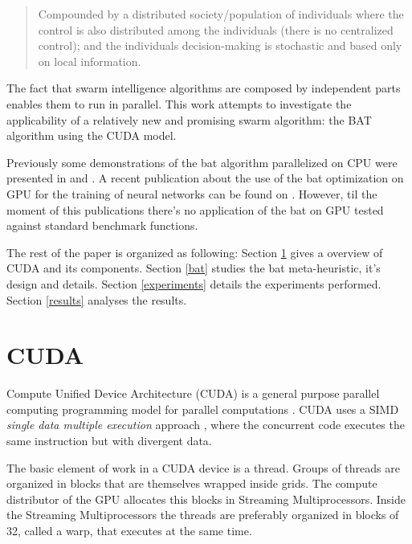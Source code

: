 \documentclass[conference]{IEEEtran}
\begin{document}
\begin{quote} Compounded by a distributed society/population of
individuals where the control is also distributed among the individuals
(there is no centralized control); and the individuals decision-making
is stochastic and based only on local information.\end{quote}

The fact that swarm intelligence algorithms are composed by
independent parts enables them to run in parallel. This work attempts
to investigate the applicability of a relatively new and promising
swarm algorithm: the BAT algorithm using the CUDA model. 

Previously some demonstrations of the bat algorithm parallelized on CPU
were presented in \cite{paralellCPUFirst} and \cite{paralellCPU}. A
recent publication about the use of the bat optimization on GPU for the training of neural networks can be found on
\cite{firstBatGPU}. However, til the moment of this publications
there's no application of the bat on GPU tested against standard
benchmark functions.

The rest of the paper is organized as following: Section \ref{cuda}
gives a overview of CUDA and its components. Section \ref{bat}
studies the bat meta-heuristic, it's design and details. Section
\ref{experiments} details the experiments performed. Section
\ref{results} analyses the results.


\section{CUDA} \label{cuda}%

Compute Unified Device Architecture (CUDA) is a general purpose
parallel computing programming model for parallel computations
\cite{cudaDefinition}. CUDA uses a SIMD \textit{single data multiple
execution} approach \cite{gpuOptimization}, where the concurrent code
executes the same instruction but with divergent data.


The basic element of work in a CUDA device is a thread. Groups of
threads are organized in blocks that are themselves wrapped inside
grids. The compute distributor of the GPU allocates this blocks in
Streaming Multiprocessors. Inside the Streaming Multiprocessors the
threads are preferably organized in blocks of 32, called a warp, that
executes at the same time.
\end{document}
